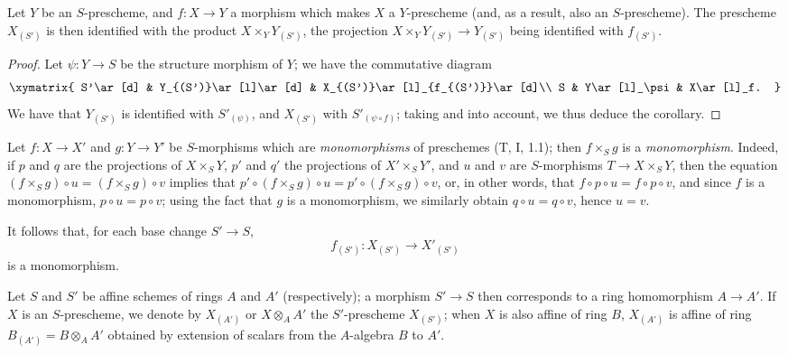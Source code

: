 \begin{corollary}[3.3.11]
\label{I.3.3.11}
Let $Y$ be an $S$-prescheme, and $f:X\to Y$ a morphism which makes $X$ a
$Y$-prescheme (and, as a result, also an $S$-prescheme). The prescheme $X_{(S')}$
is then identified with the product $X\times_Y Y_{(S')}$, the projection
$X\times_Y Y_{(S')}\to Y_{(S')}$ being identified with $f_{(S')}$.
\end{corollary}

\begin{proof}
Let $\psi:Y\to S$ be the structure morphism of $Y$; we have the commutative
diagram
\[
  \xymatrix{
    S'\ar[d] &
    Y_{(S')}\ar[l]\ar[d] &
    X_{(S')}\ar[l]_{f_{(S')}}\ar[d]\\
    S &
    Y\ar[l]_\psi &
    X\ar[l]_f.
  }
\]
We have that $Y_{(S')}$ is identified with $S'_{(\psi)}$, and $X_{(S')}$ with
$S'_{(\psi\circ f)}$; taking  and
 into account, we thus deduce the corollary.
\end{proof}

\begin{env}[3.3.12]
\label{I.3.3.12}
Let $f:X\to X'$ and $g:Y\to Y'$ be $S$-morphisms which are \emph{monomorphisms}
of preschemes (T, I, 1.1); then $f\times_S g$ is a \emph{monomorphism}. Indeed,
if $p$ and $q$ are the projections of $X\times_S Y$, $p'$ and $q'$ the projections of
$X'\times_S Y'$, and $u$ and $v$ are $S$-morphisms $T\to X\times_S Y$, then the
equation $(f\times_S g)\circ u=(f\times_S g)\circ v$ implies that
$p'\circ(f\times_S g)\circ u=p'\circ(f\times_S g)\circ v$, or, in other words, that
$f\circ p\circ u=f\circ p\circ v$, and since $f$ is a monomorphism,
$p\circ u=p\circ v$; using the fact that $g$ is a monomorphism, we similarly
obtain $q\circ u=q\circ v$, hence $u=v$.

It follows that, for each base change $S'\to S$,
\[
  f_{(S')}:X_{(S')}\to X'_{(S')}
\]
is a monomorphism.
\end{env}

\begin{env}[3.3.13]
\label{I.3.3.13}
Let $S$ and $S'$ be affine schemes of rings $A$ and $A'$ (respectively); a morphism
$S'\to S$ then corresponds to a ring homomorphism $A\to A'$. If $X$ is an
$S$-prescheme, we denote by $X_{(A')}$ or $X\otimes_A A'$ the $S'$-prescheme
$X_{(S')}$; when $X$ is also affine of ring $B$, $X_{(A')}$ is affine of ring
$B_{(A')}=B\otimes_A A'$ obtained by extension of scalars from the $A$-algebra
$B$ to $A'$.
\end{env}

